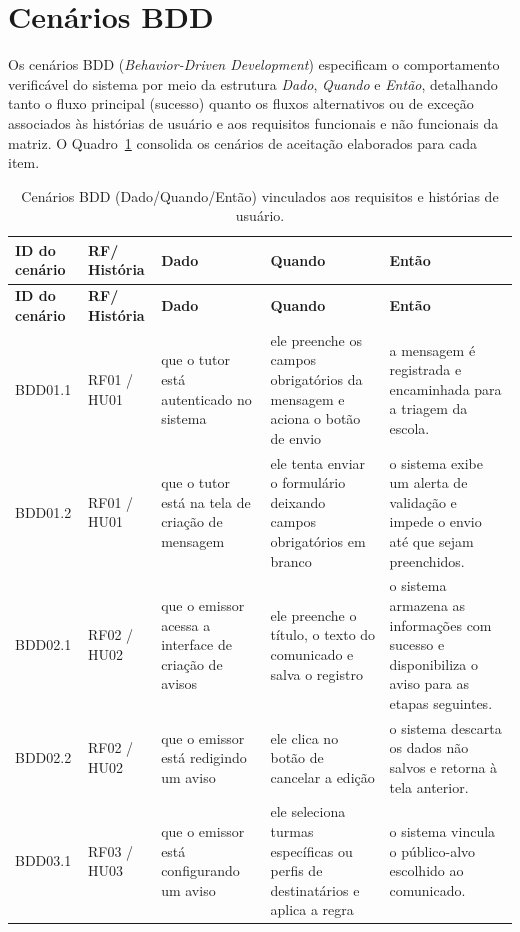 \documentclass[a4paper,12pt]{report}
\begin{document}
\section{Cenários BDD}

Os cenários BDD (\textit{Behavior-Driven Development}) especificam o comportamento verificável do sistema por meio da estrutura \textit{Dado}, \textit{Quando} e \textit{Então}, detalhando tanto o fluxo principal (sucesso) quanto os fluxos alternativos ou de exceção associados às histórias de usuário e aos requisitos funcionais e não funcionais da matriz. O Quadro~\ref{tab:cenarios-bdd} consolida os cenários de aceitação elaborados para cada item.

\begin{longtable}{|p{1.6cm}|p{1.6cm}|p{3.6cm}|p{3.6cm}|p{4.0cm}|}
\caption{Cenários BDD (Dado/Quando/Então) vinculados aos requisitos e histórias de usuário.} \label{tab:cenarios-bdd} \\
\hline
\textbf{ID do cenário} & \textbf{RF/ História} & \textbf{Dado} & \textbf{Quando} & \textbf{Então} \\
\hline
\endfirsthead
\hline
\textbf{ID do cenário} & \textbf{RF/ História} & \textbf{Dado} & \textbf{Quando} & \textbf{Então} \\
\hline
\endhead
BDD01.1 & RF01 / HU01 & que o tutor está autenticado no sistema & ele preenche os campos obrigatórios da mensagem e aciona o botão de envio & a mensagem é registrada e encaminhada para a triagem da escola. \\
\hline
BDD01.2 & RF01 / HU01 & que o tutor está na tela de criação de mensagem & ele tenta enviar o formulário deixando campos obrigatórios em branco & o sistema exibe um alerta de validação e impede o envio até que sejam preenchidos. \\
\hline
BDD02.1 & RF02 / HU02 & que o emissor acessa a interface de criação de avisos & ele preenche o título, o texto do comunicado e salva o registro & o sistema armazena as informações com sucesso e disponibiliza o aviso para as etapas seguintes. \\
\hline
BDD02.2 & RF02 / HU02 & que o emissor está redigindo um aviso & ele clica no botão de cancelar a edição & o sistema descarta os dados não salvos e retorna à tela anterior. \\
\hline
BDD03.1 & RF03 / HU03 & que o emissor está configurando um aviso & ele seleciona turmas específicas ou perfis de destinatários e aplica a regra & o sistema vincula o público-alvo escolhido ao comunicado. \\

\end{longtable}
\end{document}
